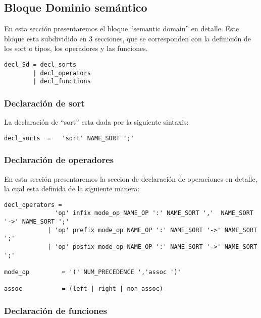 \subsection{Bloque Dominio semántico}

En esta sección presentaremos el bloque ``semantic domain'' en detalle. Este bloque esta subdividido en 3 secciones, que se corresponden con la definición de los sort o tipos, los operadores y las funciones.
\begin{center}
\lstset{language=inform}
\tiny
\begin{lstlisting}[frame=single]
decl_Sd = decl_sorts
        | decl_operators
        | decl_functions
\end{lstlisting}
\end{center}
\subsubsection{Declaración de sort}
La declaración de ``sort'' esta dada por la siguiente sintaxis:
\begin{center}
\lstset{language=inform}
\tiny
\begin{lstlisting}[frame=single]
decl_sorts  =   'sort' NAME_SORT ';'
\end{lstlisting}
\end{center}
\subsubsection{Declaración de operadores}
En esta sección presentaremos la seccion de declaración de operaciones en detalle, la cual esta definida de la siguiente manera:
\begin{center}
\lstset{language=inform}
\tiny
\begin{lstlisting}[frame=single]
decl_operators = 
              'op' infix mode_op NAME_OP ':' NAME_SORT ','  NAME_SORT '->' NAME_SORT ';' 
            | 'op' prefix mode_op NAME_OP ':' NAME_SORT '->' NAME_SORT ';'               
            | 'op' posfix mode_op NAME_OP ':' NAME_SORT '->' NAME_SORT ';'

mode_op         = '(' NUM_PRECEDENCE ','assoc ')'

assoc           = (left | right | non_assoc) 
\end{lstlisting}
\end{center}
\subsubsection{Declaración de funciones}

